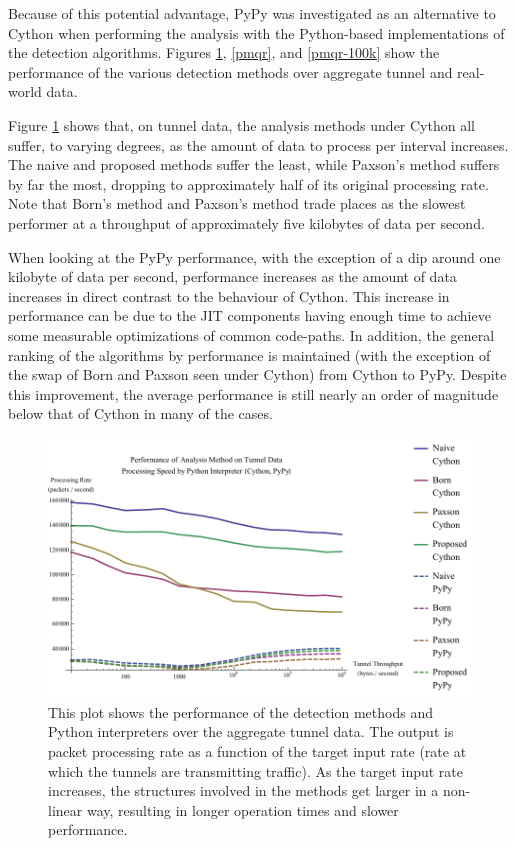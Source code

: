 \documentclass[12pt]{report}
\theoremstyle{remark}
\theoremstyle{definition}
\theoremstyle{definition}
\theoremstyle{definition}
\begin{document}
Because of this potential advantage, PyPy was investigated as an alternative to
Cython when performing the analysis with the Python-based implementations of the
detection algorithms. Figures \ref{pmat}, \ref{pmqr}, and \ref{pmqr-100k} show
the performance of the various detection methods over aggregate tunnel and
real-world data.

Figure \ref{pmat} shows that, on tunnel data, the analysis methods under Cython
all suffer, to varying degrees, as the amount of data to process per interval
increases. The naive and proposed methods suffer the least, while Paxson's
method suffers by far the most, dropping to approximately half of its original
processing rate. Note that Born's method and Paxson's method trade places as the
slowest performer at a throughput of approximately five kilobytes of data per
second.

When looking at the PyPy performance, with the exception of a dip around one
kilobyte of data per second, performance increases as the amount of data
increases in direct contrast to the behaviour of Cython. This increase in
performance can be due to the JIT components having enough time to achieve some
measurable optimizations of common code-paths. In addition, the general ranking
of the algorithms by performance is maintained (with the exception of the swap
of Born and Paxson seen under Cython) from Cython to PyPy. Despite this
improvement, the average performance is still nearly an order of magnitude below
that of Cython in many of the cases.

\begin{figure}
\centering
\includegraphics[width=\textwidth]{../figures/pmat.pdf}
\caption[Performance of Analysis Method and Python Interpreter on Aggregate
Tunnel Data]{This plot shows the performance of the detection methods and Python
interpreters over the aggregate tunnel data. The output is packet processing
rate as a function of the target input rate (rate at which the tunnels are
transmitting traffic). As the target input rate increases, the structures
involved in the methods get larger in a non-linear way, resulting in longer
operation times and slower performance.}
\label{pmat}
\end{figure}
\end{document}

